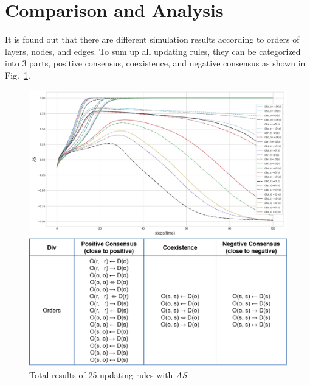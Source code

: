 \section{Comparison and Analysis}
It is found out that there are different simulation results according to orders of layers, nodes, and edges. To sum up all updating rules, they can be categorized into 3 parts, positive consensus, coexistence, and negative consensus as shown in Fig.~\ref{ordertotal}.  
\begin{figure}[!htb]
	\centering
	\includegraphics[width=\hsize]{figure/ordertotal.png}
	\caption{Total results of 25 updating rules with \textit{AS}}
	\label{ordertotal}
\end{figure}

